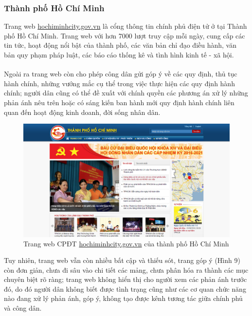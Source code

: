 \documentclass[a4paper]{article}
\begin{document}
\subsubsection{Thành phố Hồ Chí Minh}	
Trang web \url{hochiminhcity.gov.vn} là cổng thông tin chính phủ điện tử ở tại Thành phố Hồ Chí Minh. Trang web với hơn 7000 lượt truy cập mỗi ngày, cung cấp các tin tức, hoạt động nổi bật của thành phố, các văn bản chỉ đạo điều hành, văn bản quy phạm pháp luật, các báo cáo thống kê và tình hình kinh tế - xã hội.\\
\\
Ngoài ra trang web còn cho phép công dân gửi góp ý về các quy định, thủ tục hành chính, những vướng mắc cụ thể trong việc thực hiện các quy định hành chính; người dân cũng có thể đề xuất với chính quyền các phương án xử lý những phản ánh nêu trên hoặc có sáng kiến ban hành mới quy định hành chính liên quan đến hoạt động kinh doanh, đời sống nhân dân.
\begin{center}
    \begin{figure}[h]
    \begin{center}
     \includegraphics[scale=.4]{egov-tphcm.PNG}
    \end{center}
    \caption{Trang web CPĐT \url{hochiminhcity.gov.vn} của thành phố Hồ Chí Minh}
    \label{refhinh7}
    \end{figure}
\end{center}
Tuy nhiên, trang web vẫn còn nhiều bất cập và thiếu sót, trang góp ý (Hình 9) còn đơn giản, chưa đi sâu vào chi tiết các mảng, chưa phân hóa ra thành các mục chuyên biệt rõ ràng; trang web không hiển thị cho người xem các phản ánh trước đó, do đó người dân không biết được tình trạng cũng như các cơ quan chức năng nào đang xử lý phản ánh, góp ý, không tạo được kênh tương tác giữa chính phủ và công dân.
\newpage
\end{document}
